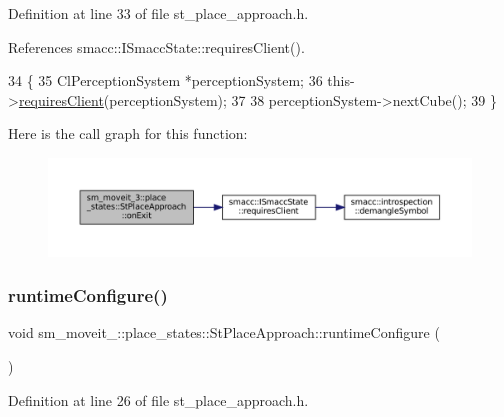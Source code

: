 Definition at line 33 of file st\+\_\+place\+\_\+approach.\+h.



References smacc\+::\+I\+Smacc\+State\+::requires\+Client().


\begin{DoxyCode}
34     \{
35         ClPerceptionSystem *perceptionSystem;
36         this->\hyperlink{classsmacc_1_1ISmaccState_a7f95c9f0a6ea2d6f18d1aec0519de4ac}{requiresClient}(perceptionSystem);
37 
38         perceptionSystem->nextCube();
39     \}
\end{DoxyCode}
Here is the call graph for this function\+:
\nopagebreak
\begin{figure}[H]
\begin{center}
\leavevmode
\includegraphics[width=350pt]{structsm__moveit__3_1_1place__states_1_1StPlaceApproach_aa0548cacb270a242ba202e50f3c9f576_cgraph}
\end{center}
\end{figure}
\mbox{\label{structsm__moveit__3_1_1place__states_1_1StPlaceApproach_aa0001a28f21038a8bc2f99f3a9c49b62}} 
\subsubsection{\texorpdfstring{runtime\+Configure()}{runtimeConfigure()}}
{\footnotesize\ttfamily void sm\+\_\+moveit\+\_\+::place\+\_\+states\+::\+St\+Place\+Approach\+::runtime\+Configure (\begin{DoxyParamCaption}{ }\end{DoxyParamCaption})\hspace{0.3cm}{\ttfamily [inline]}}



Definition at line 26 of file st\+\_\+place\+\_\+approach.\+h.



